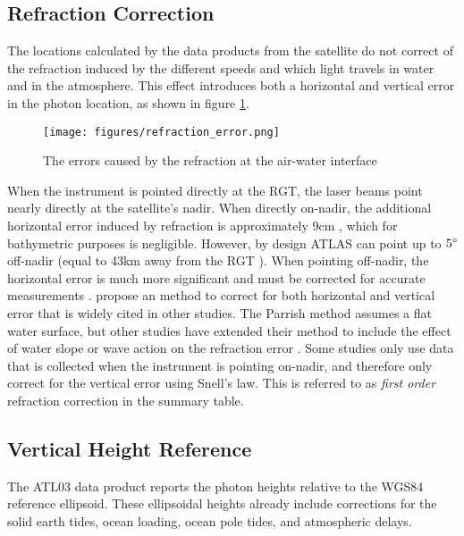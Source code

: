 \subsection{Refraction Correction}

The locations calculated by the data products from the satellite do not correct of the refraction induced by the different speeds and which light travels in water and in the atmosphere. This effect introduces both a horizontal and vertical error in the photon location, as shown in figure \ref{refract-image}.

\begin{figure}[ht]
      \centering
      \texttt{[image: figures/refraction\_error.png]}
      \caption{The errors caused by the refraction at the air-water interface}
      \label{refract-image}
\end{figure}

When the instrument is pointed directly at the RGT, the laser beams point nearly directly at the satellite's nadir. When directly on-nadir, the additional horizontal error induced by refraction is approximately 9cm \parencite{Parrish2019}, which for bathymetric purposes is negligible. However, by design ATLAS can point up to $5 \degree$ off-nadir (equal to 43km away from the RGT \parencite{Magruder2021}). When pointing off-nadir, the horizontal error is much more significant and must be corrected for accurate measurements \parencite{Parrish2019}.\citeauthor{Parrish2019} propose an method to correct for both horizontal and vertical error that is widely cited in other studies. The Parrish method assumes a flat water surface, but other studies have extended their method to include the effect of water slope or wave action on the refraction error \parencite{Ma2020,Zhang2022}. Some studies only use data that is collected when the instrument is pointing on-nadir, and therefore only correct for the vertical error using Snell's law. This is referred to as \emph{first order} refraction correction in the summary table.

\subsection{Vertical Height Reference}

The ATL03 data product reports the photon heights relative to the WGS84 reference ellipsoid. These ellipsoidal heights already include corrections for the solid earth tides, ocean loading, ocean pole tides, and atmospheric delays.

